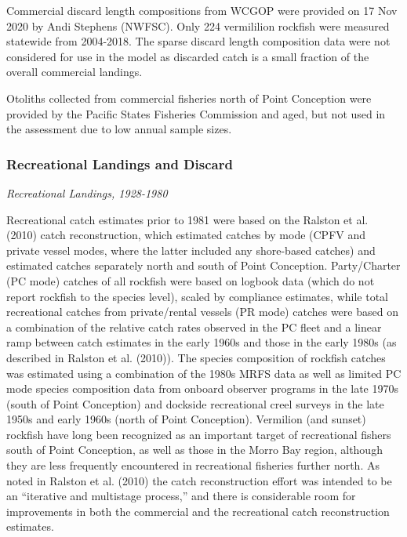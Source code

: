 \documentclass[11pt,
  english,
]{article}
\begin{document}
Commercial discard length compositions from WCGOP were provided on 17 Nov 2020 by Andi Stephens (NWFSC). Only 224 vermililion rockfish were measured statewide from 2004-2018. The sparse discard length composition data were not considered for use in the model as discarded catch is a small fraction of the overall commercial landings.

Otoliths collected from commercial fisheries north of Point Conception were provided by the Pacific States Fisheries Commission and aged, but not used in the assessment due to low annual sample sizes.


\hypertarget{recreational-landings-and-discard}{%
\subsubsection{Recreational Landings and Discard}\label{recreational-landings-and-discard}}

\leavevmode\tagmcend\tagstructend

\emph{Recreational Landings, 1928-1980}

Recreational catch estimates prior to 1981 were based on the Ralston et al. {(2010)\leavevmode\tagmcend\tagstructend} catch reconstruction, which estimated catches by mode (CPFV and private vessel modes, where the latter included any shore-based catches) and estimated catches separately north and south of Point Conception. Party/Charter (PC mode) catches of all rockfish were based on logbook data (which do not report rockfish to the species level), scaled by compliance estimates, while total recreational catches from private/rental vessels (PR mode) catches were based on a combination of the relative catch rates observed in the PC fleet and a linear ramp between catch estimates in the early 1960s and those in the early 1980s (as described in Ralston et al. {(2010)\leavevmode\tagmcend\tagstructend}). The species composition of rockfish catches was estimated using a combination of the 1980s MRFS data as well as limited PC mode species composition data from onboard observer programs in the late 1970s (south of Point Conception) and dockside recreational creel surveys in the late 1950s and early 1960s (north of Point Conception). Vermilion (and sunset) rockfish have long been recognized as an important target of recreational fishers south of Point Conception, as well as those in the Morro Bay region, although they are less frequently encountered in recreational fisheries further north. As noted in Ralston et al. {(2010)\leavevmode\tagmcend\tagstructend} the catch reconstruction effort was intended to be an ``iterative and multistage process,'' and there is considerable room for improvements in both the commercial and the recreational catch reconstruction estimates.
\end{document}
